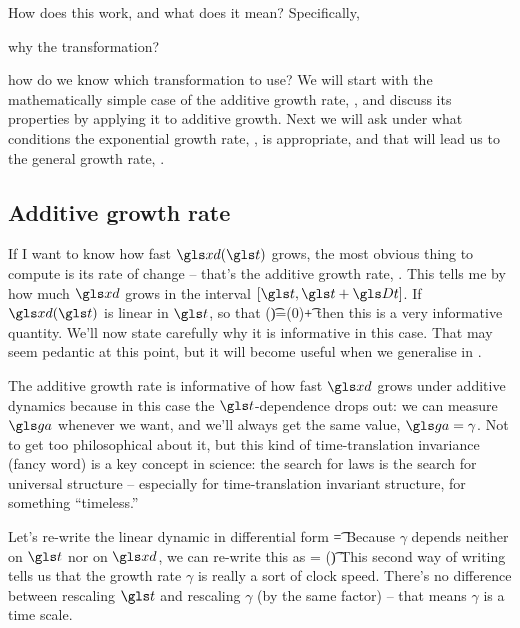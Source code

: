 How does this work, and what does it mean? Specifically, 
\bi
\item[1.]
why the transformation? 
\item[2.]
how do we know which transformation to use?
\ei
We will start with the mathematically simple case of the additive growth rate, , and discuss its properties by applying it to additive growth. Next we will ask under what conditions the exponential growth rate, , is appropriate, and that will lead us to the general growth rate, .


\subsection{Additive growth rate}
If I want to know how fast $\xd(\t)$ grows, the most obvious thing to compute is its rate of change -- that's the additive growth rate, .
This tells me by how much $\xd$ grows in the interval $[\t,\t+\Dt]$. If $\xd(\t)$ is linear in $\t$, so that 
\be
\xd(\t)=\xd(0)+\gamma \t
{}
\ee
then this is a very informative quantity. We'll now state carefully why it is informative in this case. That may seem pedantic at this point, but it will become useful when we generalise in . 

The additive growth rate  is informative of how fast $\xd$ grows under additive dynamics  because in this case the $\t$-dependence drops out: we can measure $\gad$ whenever we want, and we'll always get the same value, $\gad=\gamma$. Not to get too philosophical about it, but this kind of time-translation invariance (fancy word) is a key concept in science: the search for laws is the search for universal structure -- especially for time-translation invariant structure, for something ``timeless.''

Let's re-write the linear dynamic  in differential form
\be
\gd\xd=\gamma \gd\t
\ee
Because $\gamma$ depends neither on $\t$ nor on $\xd$, we can re-write this as
\be
\gd\xd= \gd(\gamma \t)
\ee
This second way of writing tells us that the growth rate $\gamma$ is really a sort of clock speed. There's no difference between rescaling $\t$ and rescaling $\gamma$ (by the same factor) -- that means $\gamma$ is a time scale.

